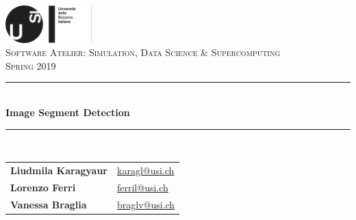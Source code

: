 \documentclass[11pt]{article}
\begin{document}
\begin{titlepage}

\newcommand{\HRule}{\rule{\linewidth}{0.5mm}} %
 
\center 
\newcommand*{\plogo}{\includegraphics[width=0.25\textwidth]{./img/logo.png}}

\plogo \\[1.5 cm] %

\textsc{\Large Software Atelier: Simulation, Data Science \& Supercomputing}\\[0.5cm] %
\textsc{\large Spring 2019 }\\[0.5cm] %


\HRule \\[1cm]
{ \huge \bfseries Image Segment Detection}\\[0.4cm] %
\HRule \\[2.0cm]
 



\begin{table}[h]
\centering
\begin{tabular}{l l}
\textbf{Liudmila Karagyaur} & {\href{mailto:karagl@usi.ch}{karagl@usi.ch}} \\
\textbf{Lorenzo Ferri} & {\href{mailto:ferril@usi.ch}{ferril@usi.ch}} \\
\textbf{Vanessa Braglia} & {\href{mailto:braglv@usi.ch}{braglv@usi.ch}} \\
\end{tabular}
\end{table}




\end{titlepage}
\end{document}

